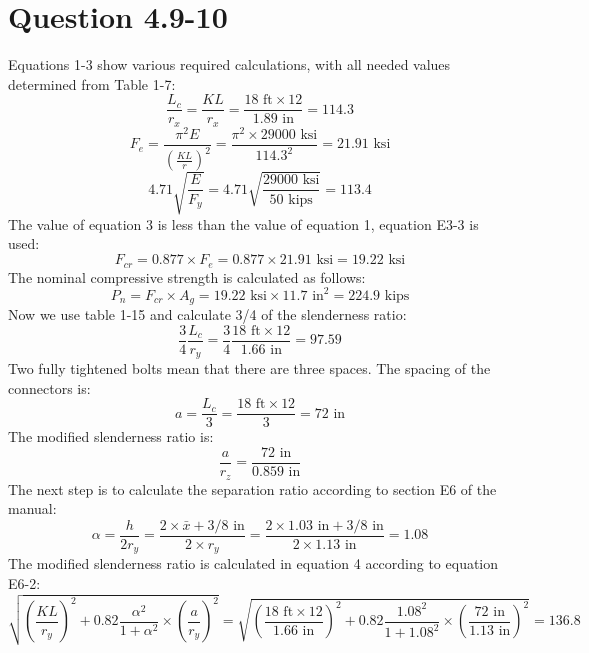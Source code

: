 \documentclass{article}
\begin{document}
\section*{Question 4.9-10}
\noindent Equations 1-3 show various required calculations, with all needed values determined from Table 1-7: 
\begin{equation}
    \frac{L_c}{r_x}=\frac{KL}{r_x}=\frac{18\text{ ft}\times 12}{1.89\text{ in}}=114.3
\end{equation}
\begin{equation} 
    F_e=\frac{\pi^2E}{\left(\frac{KL}{r}\right)^2}=\frac{\pi^2\times29000\text{ ksi}}{114.3^2}=21.91\text{ ksi}
\end{equation}
\begin{equation} 
    4.71\sqrt{\frac{E}{F_y}}=4.71\sqrt{\frac{29000\text{ ksi}}{50\text{ kips}}}=113.4
\end{equation}
The value of equation 3 is less than the value of equation 1, equation E3-3 is used: 
\[F_{cr}=0.877\times F_e=0.877\times 21.91\text{ ksi}=19.22\text{ ksi}\]
The nominal compressive strength is calculated as follows: 
\[P_n=F_{cr}\times A_g=19.22\text{ ksi}\times 11.7\text{ in}^2=224.9\text{ kips}\] 
Now we use table 1-15 and calculate 3/4 of the slenderness ratio: 
\[\frac{3}{4}\frac{L_c}{r_y}=\frac{3}{4}\frac{18\text{ ft}\times12}{1.66\text{ in}}=97.59\]
Two fully tightened bolts mean that there are three spaces. The spacing of the connectors is: 
\[a=\frac{L_c}{3}=\frac{18\text{ ft}\times 12}{3}=72\text{ in}\]
The modified slenderness ratio is: 
\[\frac{a}{r_z}=\frac{72\text{ in}}{0.859\text{ in}}\]
The next step is to calculate the separation ratio according to section E6 of the manual: 
\[\alpha = \frac{h}{2r_y}=\frac{2\times \bar{x} +3/8\text{ in}}{2\times r_y}=\frac{2\times 1.03\text{ in} +3/8\text{ in}}{2\times 1.13\text{ in}}=1.08\] 
The modified slenderness ratio is calculated in equation 4 according to equation E6-2: 
\begin{equation}
    \sqrt{\left(\frac{KL}{r_y}\right)^2+0.82\frac{\alpha^2}{1+\alpha^2}\times\left(\frac{a}{r_y}\right)^2}=\sqrt{\left(\frac{18\text{ ft}\times 12}{1.66\text{ in}}\right)^2+0.82\frac{1.08^2}{1+1.08^2}\times\left(\frac{72\text{ in}}{1.13\text{ in}}\right)^2}=136.8
\end{equation} 
\end{document}
